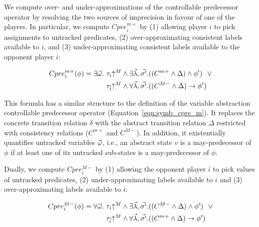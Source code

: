 We compute over- and under-approximations of the controllable predecessor operator by resolving the two sources of imprecision in favour of one of the players.  In particular, we compute $Cpre_i^{m+}$ by (1) allowing player $i$ to pick assignments to untracked predicates, (2) over-approximating consistent labels available to $i$, and (3) under-approximating consistent labels available to the opponent player $\overline{i}$:

\begin{equation}
\label{e:cprem}
\begin{aligned}
    Cpre_i^{m+}(\phi) = \exists \vec{\omega} .~&\tau_i\mathord{\uparrow^M}         \land \exists \vec{\lambda},\vec{\sigma'}. ((C^{m+} \land \Delta) \land \phi')
                                                 ~~\lor\\
                                                &\tau_{\overline{i}}\mathord{\uparrow^M} \land \forall \vec{\lambda},\vec{\sigma'}. ((C^{M-} \land\Delta) \rightarrow \phi')
\end{aligned}
\end{equation}

This formula has a similar structure to the definition of the variable abstraction controllable predecessor operator (Equation~\ref{eqn:symb_cpre_m}).  It replaces the concrete transition relation $\delta$ with the abstract transition relation $\Delta$ restricted with consistency relations ($C^{m+}$ and $C^{M-}$).  In addition, it existentially quantifies untracked variables $\vec{\omega}$, i.e., an abstract state $v$ is a may-predecessor of $\phi$ if at least one of its untracked sub-states is a may-predecessor of $\phi$.

Dually, we compute $Cpre_i^{M-}$ by (1) allowing the opponent player $\overline{i}$ to pick values of untracked predicates, (2) under-approximating labels available to $i$ and (3) over-approximating labels available to $\overline{i}$:

\begin{equation}
\label{e:cpreM}
\begin{aligned}
    Cpre_i^{M-}(\phi) = \forall \vec{\omega}.~&\tau_i\mathord{\uparrow^M}         \land \exists \vec{\lambda},\vec{\sigma'}. ((C^{M-} \land \Delta) \land \phi')
                                             ~~\lor\\
                                               &\tau_{\overline{i}}\mathord{\uparrow^M} \land \forall \vec{\lambda},\vec{\sigma'}. ((C^{m+} \land \Delta) \rightarrow \phi')
\end{aligned}
\end{equation}

